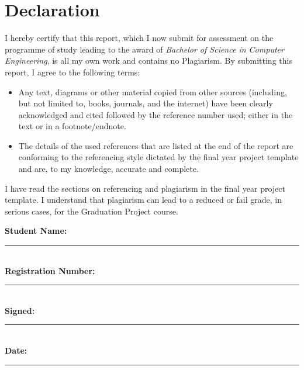 \chapter*{Declaration}

I hereby certify that this report, which I now submit for assessment on the
programme of study leading to the award of \emph{Bachelor of Science in
Computer Engineering}, is all my own work and contains no Plagiarism. By
submitting this report, I agree to the following terms:

\begin{itemize}
  \item Any text, diagrams or other material copied from other sources
        (including, but not limited to, books, journals, and the internet)
        have been clearly acknowledged and cited followed by the reference
        number used; either in the text or in a footnote/endnote.
  \item The details of the used references that are listed at the end of the
        report are conforming to the referencing style dictated by the final
        year project template and are, to my knowledge, accurate and complete.
\end{itemize}

I have read the sections on referencing and plagiarism in the final year
project template. I understand that plagiarism can lead to a reduced or fail
grade, in serious cases, for the Graduation Project course.

\vspace{36pt}
\noindent\textbf{Student Name:} \rule{8cm}{0.4pt}\\[6pt]
\noindent\textbf{Registration Number:} \rule{6cm}{0.4pt}\\[6pt]
\noindent\textbf{Signed:} \rule{8cm}{0.4pt}\\[6pt]
\noindent\textbf{Date:} \rule{4cm}{0.4pt}
